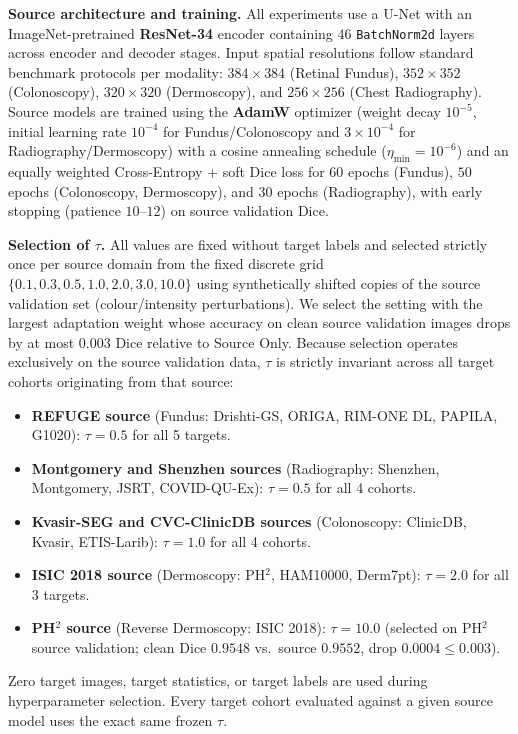 \documentclass[11pt,a4paper]{article}
\begin{document}
\noindent\textbf{Source architecture and training.} All experiments use a U-Net with an ImageNet-pretrained \textbf{ResNet-34} encoder containing $46$ \texttt{BatchNorm2d} layers across encoder and decoder stages. Input spatial resolutions follow standard benchmark protocols per modality: $384\times 384$ (Retinal Fundus), $352\times 352$ (Colonoscopy), $320\times 320$ (Dermoscopy), and $256\times 256$ (Chest Radiography). Source models are trained using the \textbf{AdamW} optimizer (weight decay $10^{-5}$, initial learning rate $10^{-4}$ for Fundus/Colonoscopy and $3\times 10^{-4}$ for Radiography/Dermoscopy) with a cosine annealing schedule ($\eta_{\min}=10^{-6}$) and an equally weighted Cross-Entropy + soft Dice loss for $60$ epochs (Fundus), $50$ epochs (Colonoscopy, Dermoscopy), and $30$ epochs (Radiography), with early stopping (patience $10$--$12$) on source validation Dice.

\noindent\textbf{Selection of $\tau$.} All values are fixed without target labels and selected strictly once per source domain from the fixed discrete grid $\{0.1, 0.3, 0.5, 1.0, 2.0, 3.0, 10.0\}$ using synthetically shifted copies of the source validation set (colour/intensity perturbations). We select the setting with the largest adaptation weight whose accuracy on clean source validation images drops by at most $0.003$ Dice relative to Source Only. Because selection operates exclusively on the source validation data, $\tau$ is strictly invariant across all target cohorts originating from that source:
\begin{itemize}[leftmargin=1.2em,itemsep=1pt]
\item \textbf{REFUGE source} (Fundus: Drishti-GS, ORIGA, RIM-ONE DL, PAPILA, G1020): $\tau = 0.5$ for all 5 targets.
\item \textbf{Montgomery and Shenzhen sources} (Radiography: Shenzhen, Montgomery, JSRT, COVID-QU-Ex): $\tau = 0.5$ for all 4 cohorts.
\item \textbf{Kvasir-SEG and CVC-ClinicDB sources} (Colonoscopy: ClinicDB, Kvasir, ETIS-Larib): $\tau = 1.0$ for all 4 cohorts.
\item \textbf{ISIC 2018 source} (Dermoscopy: PH$^2$, HAM10000, Derm7pt): $\tau = 2.0$ for all 3 targets.
\item \textbf{PH$^2$ source} (Reverse Dermoscopy: ISIC 2018): $\tau = 10.0$ (selected on PH$^2$ source validation; clean Dice $0.9548$ vs.\ source $0.9552$, drop $0.0004 \le 0.003$).
\end{itemize}
Zero target images, target statistics, or target labels are used during hyperparameter selection. Every target cohort evaluated against a given source model uses the exact same frozen $\tau$.
\end{document}
